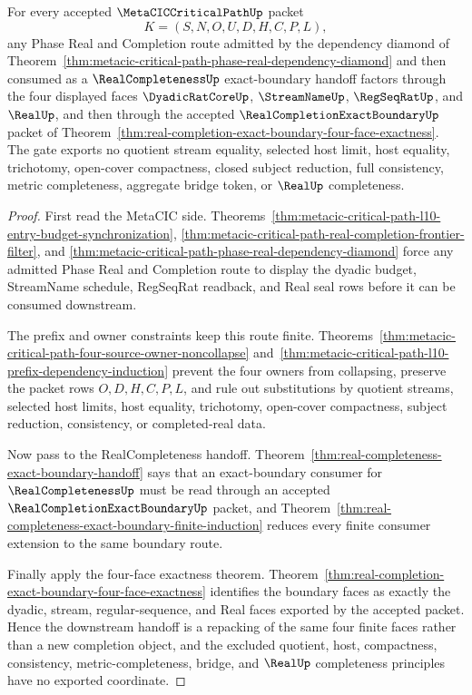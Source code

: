 \begin{theorem}
\label{thm:metacic-critical-path-realcompleteness-exact-boundary-gate}
For every accepted $\MetaCICCriticalPathUp$ packet
$$
K=(S,N,O,U,D,H,C,P,L),
$$
any Phase Real and Completion route admitted by the dependency diamond of Theorem~\ref{thm:metacic-critical-path-phase-real-dependency-diamond} and then consumed as a $\RealCompletenessUp$ exact-boundary handoff factors through the four displayed faces $\DyadicRatCoreUp$, $\StreamNameUp$, $\RegSeqRatUp$, and $\RealUp$, and then through the accepted $\RealCompletionExactBoundaryUp$ packet of Theorem~\ref{thm:real-completion-exact-boundary-four-face-exactness}. The gate exports no quotient stream equality, selected host limit, host equality, trichotomy, open-cover compactness, closed subject reduction, full consistency, metric completeness, aggregate bridge token, or $\RealUp$ completeness.
\end{theorem}
\begin{proof}
First read the MetaCIC side. Theorems~\ref{thm:metacic-critical-path-l10-entry-budget-synchronization}, \ref{thm:metacic-critical-path-real-completion-frontier-filter}, and \ref{thm:metacic-critical-path-phase-real-dependency-diamond} force any admitted Phase Real and Completion route to display the dyadic budget, StreamName schedule, RegSeqRat readback, and Real seal rows before it can be consumed downstream.

The prefix and owner constraints keep this route finite. Theorems~\ref{thm:metacic-critical-path-four-source-owner-noncollapse} and~\ref{thm:metacic-critical-path-l10-prefix-dependency-induction} prevent the four owners from collapsing, preserve the packet rows $O,D,H,C,P,L$, and rule out substitutions by quotient streams, selected host limits, host equality, trichotomy, open-cover compactness, subject reduction, consistency, or completed-real data.

Now pass to the RealCompleteness handoff. Theorem~\ref{thm:real-completeness-exact-boundary-handoff} says that an exact-boundary consumer for $\RealCompletenessUp$ must be read through an accepted $\RealCompletionExactBoundaryUp$ packet, and Theorem~\ref{thm:real-completeness-exact-boundary-finite-induction} reduces every finite consumer extension to the same boundary route.

Finally apply the four-face exactness theorem. Theorem~\ref{thm:real-completion-exact-boundary-four-face-exactness} identifies the boundary faces as exactly the dyadic, stream, regular-sequence, and Real faces exported by the accepted packet. Hence the downstream handoff is a repacking of the same four finite faces rather than a new completion object, and the excluded quotient, host, compactness, consistency, metric-completeness, bridge, and $\RealUp$ completeness principles have no exported coordinate.
\end{proof}

